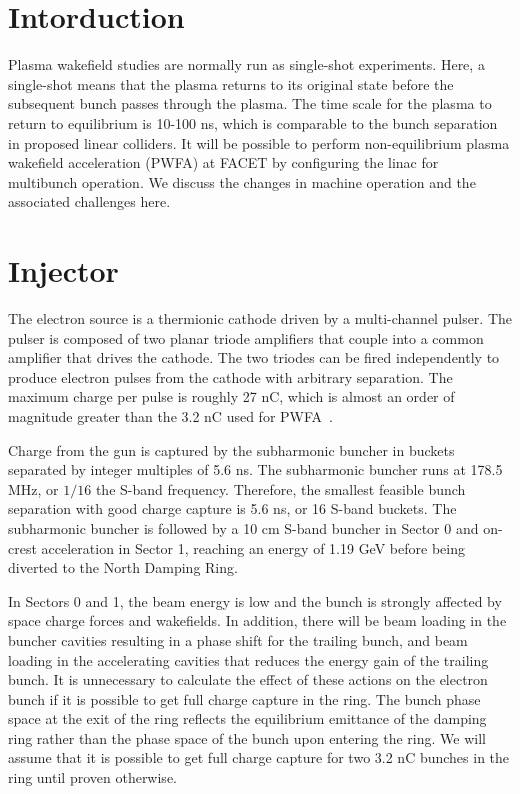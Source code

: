 \documentclass[aps,prl,preprint,groupedaddress]{revtex4-1}
\begin{document}
\section{Intorduction}
Plasma wakefield studies are normally run as single-shot experiments. Here, a single-shot means that the plasma returns to its original state before the subsequent bunch passes through the plasma. The time scale for the plasma to return to equilibrium is 10-100 ns, which is comparable to the bunch separation in proposed linear colliders. It will be possible to perform non-equilibrium plasma wakefield acceleration (PWFA) at FACET by configuring the linac for multibunch operation. We discuss the changes in machine operation and the associated challenges here.
\section{Injector}
The electron source is a thermionic cathode driven by a multi-channel pulser. The pulser is composed of two planar triode amplifiers that couple into a common amplifier that drives the cathode. The two triodes can be fired independently to produce electron pulses from the cathode with arbitrary separation. The maximum charge per pulse is roughly 27 nC, which is almost an order of magnitude greater than the 3.2 nC used for PWFA~\cite{gun}.

Charge from the gun is captured by the subharmonic buncher in buckets separated by integer multiples of 5.6 ns. The subharmonic buncher runs at 178.5 MHz, or $1/16$ the S-band frequency. Therefore, the smallest feasible bunch separation with good charge capture is 5.6 ns, or 16 S-band buckets. The subharmonic buncher is followed by a 10 cm S-band buncher in Sector 0 and on-crest acceleration in Sector 1, reaching an energy of 1.19 GeV before being diverted to the North Damping Ring. 

In Sectors 0 and 1, the beam energy is low and the bunch is strongly affected by space charge forces and wakefields. In addition, there will be beam loading in the buncher cavities resulting in a phase shift for the trailing bunch, and beam loading in the accelerating cavities that reduces the energy gain of the trailing bunch. It is unnecessary to calculate the effect of these actions on the electron bunch if it is possible to get full charge capture in the ring. The bunch phase space at the exit of the ring reflects the equilibrium emittance of the damping ring rather than the phase space of the bunch upon entering the ring. We will assume that it is possible to get full charge capture for two 3.2 nC bunches in the ring until proven otherwise.
\end{document}
